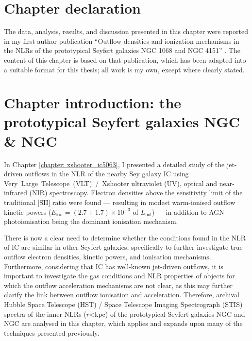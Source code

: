 \section*{Chapter declaration}
The data, analysis, results, and discussion presented in this chapter were reported in my first-author publication ``Outflow densities and ionization mechanisms in the NLRs of the prototypical Seyfert galaxies NGC 1068 and NGC 4151'' \citep{HoldenTadhunter2023}. The content of this chapter is based on that publication, which has been adapted into a suitable format for this thesis; all work is my own, except where clearly stated.

\newpage

\section[Chapter introduction]{Chapter introduction: the prototypical Seyfert galaxies NGC \& NGC}
\label{section: stis_seyferts: introduction}

In Chapter \ref{chapter: xshooter_ic5063}, I presented a detailed study of the jet-driven outflows in the NLR of the nearby Sey galaxy IC using \mbox{Very Large Telescope (VLT) / Xshooter} ultraviolet (UV), optical and near-infrared (NIR) spectroscopy. Electron densities above the sensitivity limit of the traditional [SII] ratio were found --- resulting in modest warm-ionised outflow kinetic powers ($\dot{E}_\mathrm{kin}=(2.7\pm1.7)\times10^{-3}$ of $L_\mathrm{bol}$) --- in addition to AGN-photoionisation being the dominant ionisation mechanism.

There is now a clear need to determine whether the conditions found in the NLR of IC are similar in other Seyfert galaxies, specifically to further investigate true outflow electron densities, kinetic powers, and ionisation mechanisms. Furthermore, considering that IC has well-known jet-driven outflows, it is important to investigate the gas conditions and NLR properties of objects for which the outflow acceleration mechanisms are not clear, as this may further clarify the link between outflow ionisation and acceleration. Therefore, archival Hubble Space Telescope (HST) / Space Telescope Imaging Spectrograph (STIS) spectra of the inner NLRs ($r$\;\textless{}\;kpc) of the prototypical Seyfert galaxies NGC and NGC are analysed in this chapter, which applies and expands upon many of the techniques presented previously.


